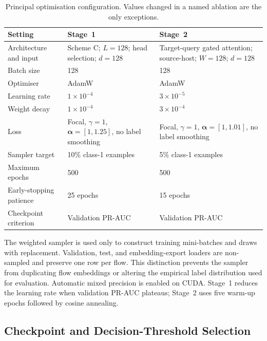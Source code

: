 \documentclass[11pt,fleqn]{report}
\begin{document}
\begin{table}[H]
    \centering
    \caption{Principal optimisation configuration. Values changed in a named ablation are the only exceptions.}
    \label{tab:experimental_training_config}
    \begin{tabular}{@{}p{3.0cm}p{4.6cm}p{5.7cm}@{}}
        \toprule
        Setting & Stage~1 & Stage~2 \\
        \midrule
        Architecture and input & Scheme C; $L=128$; head selection; $d=128$ & Target-query gated attention; source-host; $W=128$; $d=128$ \\
        Batch size & 128 & 128 \\
        Optimiser & AdamW & AdamW \\
        Learning rate & $1\times10^{-4}$ & $3\times10^{-5}$ \\
        Weight decay & $1\times10^{-4}$ & $3\times10^{-4}$ \\
        Loss & Focal, $\gamma=1$, $\boldsymbol{\alpha}=[1,1.25]$, no label smoothing & Focal, $\gamma=1$, $\boldsymbol{\alpha}=[1,1.01]$, no label smoothing \\
        Sampler target & 10\% class-1 examples & 5\% class-1 examples \\
        Maximum epochs & 500 & 500 \\
        Early-stopping patience & 25 epochs & 15 epochs \\
        Checkpoint criterion & Validation PR-AUC & Validation PR-AUC \\
        \bottomrule
    \end{tabular}
\end{table}

The weighted sampler is used only to construct training mini-batches and draws with replacement. Validation, test, and embedding-export loaders are non-sampled and preserve one row per flow. This distinction prevents the sampler from duplicating flow embeddings or altering the empirical label distribution used for evaluation. Automatic mixed precision is enabled on CUDA. Stage~1 reduces the learning rate when validation PR-AUC plateaus; Stage~2 uses five warm-up epochs followed by cosine annealing.

\subsection{Checkpoint and Decision-Threshold Selection}
\label{subsubsec:experimental_thresholding}
\end{document}
